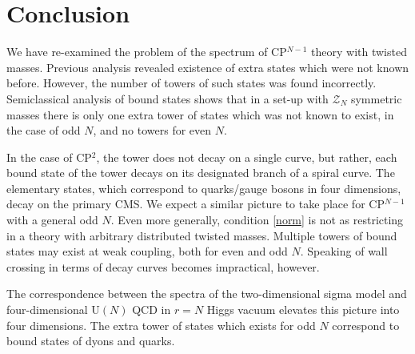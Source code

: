 \documentclass[epsfig,12pt]{article}
\newcommand{\mc}[1]{\mathcal{#1}}
\begin{document}
\newpage

\section{Conclusion}
\label{conclu}
\setcounter{equation}{0}

	We have re-examined the problem of the spectrum of CP$^{N-1}$ theory with twisted masses.
	Previous analysis \cite{Bolokhov:2011mp} revealed existence of extra states which were not known before.
	However, the number of towers of such states was found incorrectly.
	Semiclassical analysis of bound states \cite{Dorey:1998yh} shows that in a set-up
	with $ \mc{Z}_N $ symmetric masses there is only one extra tower of states which was not known to exist,
	in the case of odd $ N $, and no towers for even $ N $.

	In the case of CP$^2$, the tower does not decay on a single curve, but rather, each bound state of the tower
	decays on its designated branch of a spiral curve. 
	The elementary states, which correspond to quarks/gauge bosons in four dimensions, decay on the primary CMS.
	We expect a similar picture to take place for CP$^{N-1}$ with a general odd $ N $.
	Even more generally, condition \eqref{norm} is not as restricting in a theory with arbitrary distributed 
	twisted masses.
	Multiple towers of bound states may exist at weak coupling, both for even and odd $ N $.
	Speaking of wall crossing in terms of decay curves becomes impractical, however.

	The correspondence between the spectra of the two-dimensional sigma model and four-dimensional U$(N)$ QCD
	in $r=N$  Higgs vacuum elevates this picture into four dimensions.
	The extra tower of states which exists for odd $ N $ correspond to bound states of dyons and quarks.

	

\end{document}
